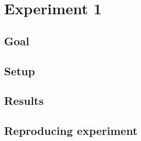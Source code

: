 \section{Experiment 1}
\label{sec:exp1}
\subsection{Goal}
\subsection{Setup}
\subsection{Results}
\subsection{Reproducing experiment}
